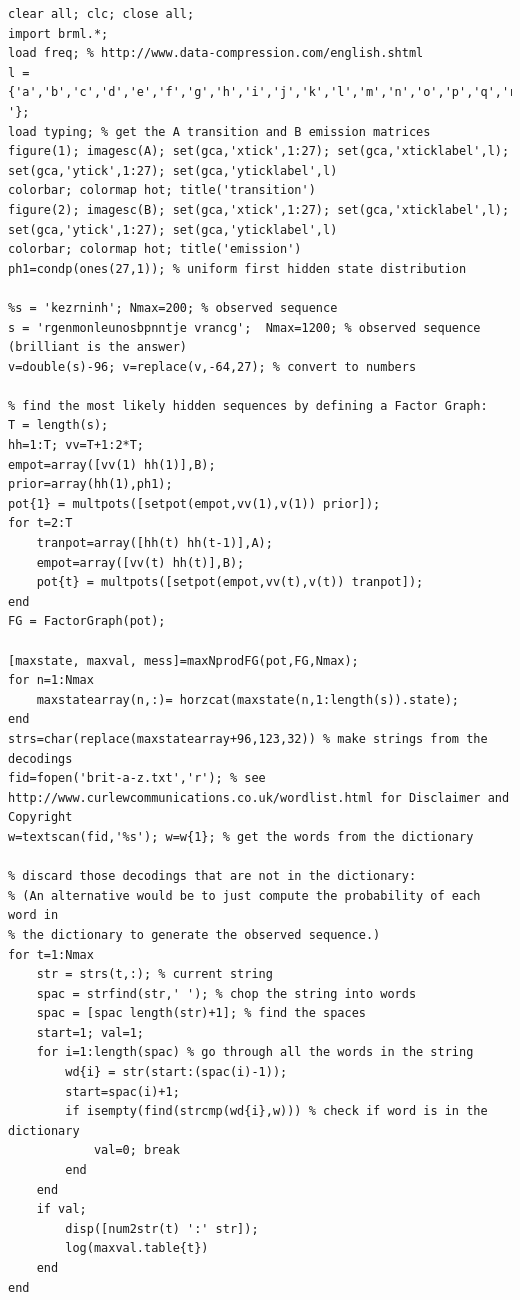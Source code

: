 \documentclass[11pt,a4paper,oneside]{report}
\begin{document}
\begin{lstlisting}
clear all; clc; close all;
import brml.*;
load freq; % http://www.data-compression.com/english.shtml
l = {'a','b','c','d','e','f','g','h','i','j','k','l','m','n','o','p','q','r','s','t','u','v','w','x','y','z',' '};
load typing; % get the A transition and B emission matrices
figure(1); imagesc(A); set(gca,'xtick',1:27); set(gca,'xticklabel',l); set(gca,'ytick',1:27); set(gca,'yticklabel',l)
colorbar; colormap hot; title('transition')
figure(2); imagesc(B); set(gca,'xtick',1:27); set(gca,'xticklabel',l); set(gca,'ytick',1:27); set(gca,'yticklabel',l)
colorbar; colormap hot; title('emission')
ph1=condp(ones(27,1)); % uniform first hidden state distribution

%s = 'kezrninh'; Nmax=200; % observed sequence
s = 'rgenmonleunosbpnntje vrancg';  Nmax=1200; % observed sequence (brilliant is the answer)
v=double(s)-96; v=replace(v,-64,27); % convert to numbers

% find the most likely hidden sequences by defining a Factor Graph:
T = length(s);
hh=1:T; vv=T+1:2*T;
empot=array([vv(1) hh(1)],B);
prior=array(hh(1),ph1);
pot{1} = multpots([setpot(empot,vv(1),v(1)) prior]);
for t=2:T
    tranpot=array([hh(t) hh(t-1)],A);
    empot=array([vv(t) hh(t)],B);
    pot{t} = multpots([setpot(empot,vv(t),v(t)) tranpot]);
end
FG = FactorGraph(pot);

[maxstate, maxval, mess]=maxNprodFG(pot,FG,Nmax);
for n=1:Nmax
    maxstatearray(n,:)= horzcat(maxstate(n,1:length(s)).state);
end
strs=char(replace(maxstatearray+96,123,32)) % make strings from the decodings
fid=fopen('brit-a-z.txt','r'); % see http://www.curlewcommunications.co.uk/wordlist.html for Disclaimer and Copyright
w=textscan(fid,'%s'); w=w{1}; % get the words from the dictionary

% discard those decodings that are not in the dictionary:
% (An alternative would be to just compute the probability of each word in
% the dictionary to generate the observed sequence.)
for t=1:Nmax
    str = strs(t,:); % current string
    spac = strfind(str,' '); % chop the string into words
    spac = [spac length(str)+1]; % find the spaces
    start=1; val=1;
    for i=1:length(spac) % go through all the words in the string
        wd{i} = str(start:(spac(i)-1));
        start=spac(i)+1;
        if isempty(find(strcmp(wd{i},w))) % check if word is in the dictionary
            val=0; break
        end
    end
    if val; 
        disp([num2str(t) ':' str]);
        log(maxval.table{t}) 
    end
end
\end{lstlisting}
\end{document}
